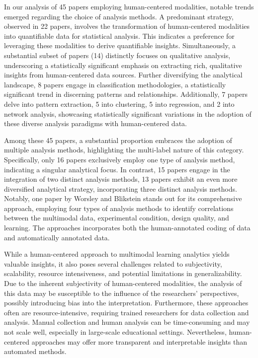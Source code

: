 \documentclass[manuscript,screen,review]{acmart}
\begin{document}
In our analysis of 45 papers employing human-centered modalities, notable trends emerged regarding the choice of analysis methods. A predominant strategy, observed in 22 papers, involves the transformation of human-centered modalities into quantifiable data for statistical analysis. This indicates a preference for leveraging these modalities to derive quantifiable insights. Simultaneously, a substantial subset of papers (14) distinctly focuses on qualitative analysis, underscoring a statistically significant emphasis on extracting rich, qualitative insights from human-centered data sources. Further diversifying the analytical landscape, 8 papers engage in classification methodologies, a statistically significant trend in discerning patterns and relationships. Additionally, 7 papers delve into pattern extraction, 5 into clustering, 5 into regression, and 2 into network analysis, showcasing statistically significant variations in the adoption of these diverse analysis paradigms with human-centered data.

Among these 45 papers, a substantial proportion embraces the adoption of multiple analysis methods, highlighting the multi-label nature of this category. Specifically, only 16 papers exclusively employ one type of analysis method, indicating a singular analytical focus. In contrast, 15 papers engage in the integration of two distinct analysis methods, 13 papers exhibit an even more diversified analytical strategy, incorporating three distinct analysis methods. Notably, one paper by Worsley and Blikstein \cite{3095923626} stands out for its comprehensive approach, employing four types of analysis methods to identify correlations between the multimodal data, experimental condition, design quality, and learning. The approaches incorporates both the human-annotated coding of data and automatically annotated data.

While a human-centered approach to multimodal learning analytics yields valuable insights, it also poses several challenges related to subjectivity, scalability, resource intensiveness, and potential limitations in generalizability. Due to the inherent subjectivity of human-centered modalities, the analysis of this data may be susceptible to the influence of the researchers' perspectives, possibly introducing bias into the interpretation. Furthermore, these approaches often are resource-intensive, requiring trained researchers for data collection and analysis. Manual collection and human analysis can be time-consuming and may not scale well, especially in large-scale educational settings. Nevertheless, human-centered approaches may offer more transparent and interpretable insights than automated methods.
\end{document}
